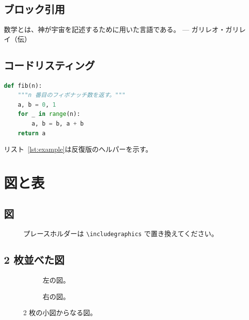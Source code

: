 \documentclass[a4paper,11pt]{ltjsarticle}
\theoremstyle{plain}
\theoremstyle{definition}
\theoremstyle{remark}
\begin{document}
\subsection{ブロック引用}

\begin{displayquote}
  数学とは、神が宇宙を記述するために用いた言語である。
  \hfill --- ガリレオ・ガリレイ（伝）
\end{displayquote}

\subsection{コードリスティング}

\begin{lstlisting}[language=Python, caption={短い例。}, label={lst:example}]
def fib(n):
    """n 番目のフィボナッチ数を返す。"""
    a, b = 0, 1
    for _ in range(n):
        a, b = b, a + b
    return a
\end{lstlisting}

リスト~\ref{lst:example}は反復版のヘルパーを示す。

\section{図と表}

\subsection{図}

\begin{figure}[ht]
  \centering
  \fbox{\rule{0pt}{6em}\rule{0.6\linewidth}{0pt}}
  \caption{プレースホルダーは \texttt{\textbackslash includegraphics} で置き換えてください。}
  \label{fig:example}
\end{figure}

\subsection{2 枚並べた図}

\begin{figure}[ht]
  \centering
  \begin{subfigure}[t]{0.45\linewidth}
    \centering
    \fbox{\rule{0pt}{4em}\rule{0.9\linewidth}{0pt}}
    \caption{左の図。}
    \label{fig:left}
  \end{subfigure}\hfill
  \begin{subfigure}[t]{0.45\linewidth}
    \centering
    \fbox{\rule{0pt}{4em}\rule{0.9\linewidth}{0pt}}
    \caption{右の図。}
    \label{fig:right}
  \end{subfigure}
  \caption{2 枚の小図からなる図。}
  \label{fig:subs}
\end{figure}
\end{document}
